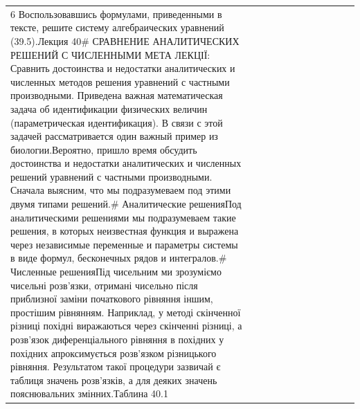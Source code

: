\documentclass[
  ukrainian,
]{article}
\newcounter{none} %
\begin{document}
{\def\LTcaptype{none} %
\begin{longtable}[]{@{}
  >{\raggedright\arraybackslash}p{}
  >{\raggedright\arraybackslash}p{}
  >{\raggedright\arraybackslash}p{}
  >{\raggedright\arraybackslash}p{}
  >{\raggedright\arraybackslash}p{}
  >{\raggedright\arraybackslash}p{}
  >{\raggedright\arraybackslash}p{}
  >{\raggedright\arraybackslash}p{}
  >{\raggedright\arraybackslash}p{}
  >{\raggedright\arraybackslash}p{}
  >{\raggedright\arraybackslash}p{}
  >{\raggedright\arraybackslash}p{}@{}}
\toprule\noalign{}
\begin{minipage}[b]{\linewidth}\raggedright
6 Воспользовавшись формулами, приведенными в тексте, решите систему
алгебраических уравнений (39.5).Лекция 40\# СРАВНЕНИЕ АНАЛИТИЧЕСКИХ
РЕШЕНИЙ С ЧИСЛЕННЫМИ МЕТА ЛЕКЦІЇ: Сравнить достоинства и недостатки
аналитических и численных методов решения уравнений с частными
производными. Приведена важная математическая задача об идентификации
физических величин (параметрическая идентификация). В связи с этой
задачей рассматривается один важный пример из биологии.Вероятно, пришло
время обсудить достоинства и недостатки аналитических и численных
решений уравнений с частными производными. Сначала выясним, что мы
подразумеваем под этими двумя типами решений.\# Аналитические решенияПод
аналитическими решениями мы подразумеваем такие решения, в которых
неизвестная функция и выражена через независимые переменные и параметры
системы в виде формул, бесконечных рядов и интегралов.\# Численные
решенияПід чисельним ми зрозуміємо чисельні розв'язки, отримані чисельно
після приблизної заміни початкового рівняння іншим, простішим рівнянням.
Наприклад, у методі скінченної різниці похідні виражаються через
скінченні різниці, а розв'язок диференціального рівняння в похідних у
похідних апроксимується розв'язком різницького рівняння. Результатом
такої процедури зазвичай є таблиця значень розв'язків, а для деяких
значень пояснювальних змінних.Таблина 40.1
\end{minipage} & \begin{minipage}[b]{\linewidth}\raggedright

\end{minipage}
\end{longtable}}
\end{document}
